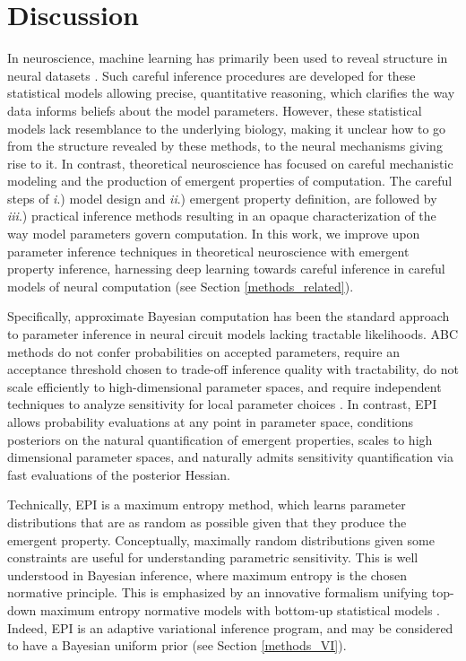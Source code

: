 \documentclass[11pt]{article}
\begin{document}
\section{Discussion} 

In neuroscience, machine learning has primarily been used to reveal structure in neural datasets \cite{paninski2018neural}.
Such careful inference procedures are developed for these statistical models allowing precise, quantitative reasoning, which clarifies the way data informs beliefs about the model parameters.  
However, these statistical models lack resemblance to the underlying biology, making it unclear how to go from the structure revealed by these methods, to the neural mechanisms giving rise to it. 
In contrast, theoretical neuroscience has focused on careful mechanistic modeling and the production of emergent properties of computation.  
The careful steps of \emph{i}.) model design and \emph{ii}.) emergent property definition, are followed by \emph{iii}.) practical inference methods resulting in an opaque characterization of the way model parameters govern computation.  
In this work, we improve upon parameter inference techniques in theoretical neuroscience with emergent property inference, harnessing deep learning towards careful inference in careful models of neural computation (see Section \ref{methods_related}).

Specifically, approximate Bayesian computation \cite{beaumont2002approximate, marjoram2003markov, sisson2007sequential} has been the standard approach to parameter inference in neural circuit models lacking tractable likelihoods.
ABC methods do not confer probabilities on accepted parameters, require an acceptance threshold chosen to trade-off inference quality with tractability, do not scale efficiently to high-dimensional parameter spaces, and require independent techniques to analyze sensitivity for local parameter choices \cite{sisson2018handbook}.
In contrast, EPI allows probability evaluations at any point in parameter space, conditions posteriors on the natural quantification of emergent properties, scales to high dimensional parameter spaces, and naturally admits sensitivity quantification via fast evaluations of the posterior Hessian.

Technically, EPI is a maximum entropy method, which learns parameter distributions that are as random as possible given that they produce the emergent property.
Conceptually, maximally random distributions given some constraints are useful for understanding parametric sensitivity.
This is well understood in Bayesian inference, where maximum entropy is the chosen normative principle.
This is emphasized by an innovative formalism unifying top-down maximum entropy normative models with bottom-up statistical models \cite{mlynarski2020statistical}.
Indeed, EPI is an adaptive variational inference program, and may be considered to have a Bayesian uniform prior (see Section \ref{methods_VI}).
\end{document}
